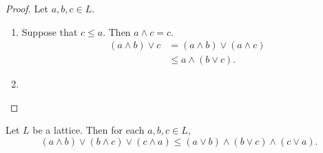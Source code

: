 \documentclass{book}
\begin{document}
	\begin{proof}
		Let $a,b,c \in L$. 
		\begin{enumerate}
			\item Suppose that $c \leq a$. Then $a \wedge c = c$. 
			\begin{align*}
				(a \wedge b) \vee c
				& = (a \wedge b) \vee (a \wedge c) \\
				& \leq a \wedge (b \vee c).
			\end{align*}
			\item {}
		\end{enumerate}
	\end{proof}
	
	\begin{ex}
		Let $L$ be a lattice. Then for each $a,b,c \in L$, 
		$$(a \wedge b) \vee (b \wedge c) \vee (c \wedge a) \leq (a \vee b) \wedge (b \vee c) \wedge (c \vee a).$$
	\end{ex}
	
\end{document}
